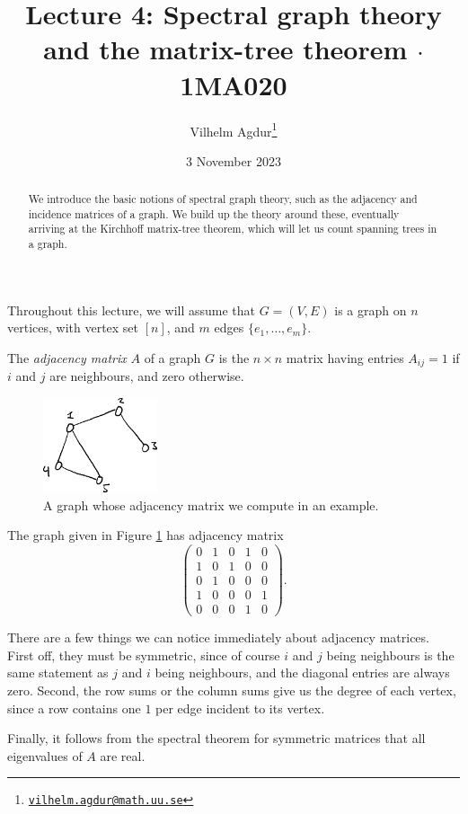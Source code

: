 \documentclass[nobib]{tufte-handout}
\title{Lecture 4: Spectral graph theory and the matrix-tree theorem $\cdot$ 1MA020}
\author[Vilhelm Agdur]{Vilhelm Agdur\thanks{\href{mailto:vilhelm.agdur@math.uu.se}{\nolinkurl{vilhelm.agdur@math.uu.se}}}}
\date{3 November 2023}
\begin{document}
\maketitle%

\begin{abstract}
\noindent
We introduce the basic notions of spectral graph theory, such as the adjacency and incidence matrices of a graph. We build up the theory around these, eventually arriving at the Kirchhoff matrix-tree theorem, which will let us count spanning trees in a graph.
\end{abstract}

Throughout this lecture, we will assume that $G = (V, E)$ is a graph on $n$ vertices, with vertex set $[n]$, and $m$ edges $\{e_1, \ldots, e_m\}$.

\begin{definition}
    The \emph{adjacency matrix} $A$ of a graph $G$ is the $n\times n$ matrix having entries $A_{ij} = 1$ if $i$ and $j$ are neighbours, and zero otherwise.
\end{definition}

\begin{figure}
    \centering
    \includegraphics[width=0.3\textwidth]{graphics/L4_spectral/graph_for_adjmat.png}
    \caption{A graph whose adjacency matrix we compute in an example.}
    \label{fig:graph_for_adjmat}
\end{figure}

\begin{example}
    The graph given in Figure \ref{fig:graph_for_adjmat} has adjacency matrix
    $$\begin{pmatrix}
        0 & 1 & 0 & 1 & 0 \\
        1 & 0 & 1 & 0 & 0 \\
        0 & 1 & 0 & 0 & 0 \\
        1 & 0 & 0 & 0 & 1 \\
        0 & 0 & 0 & 1 & 0 
        \end{pmatrix}.$$
\end{example}

\begin{remark}
    There are a few things we can notice immediately about adjacency matrices. First off, they must be symmetric, since of course $i$ and $j$ being neighbours is the same statement as $j$ and $i$ being neighbours, and the diagonal entries are always zero. Second, the row sums or the column sums give us the degree of each vertex, since a row contains one $1$ per edge incident to its vertex.

    Finally, it follows from the spectral theorem for symmetric matrices that all eigenvalues of $A$ are real.
\end{remark}
\end{document}
